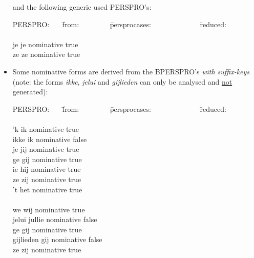 \begin{itemize}
and the following generic used PERSPRO's:

\begin{tabbing}
PERSPRO: \ \ \  \= from: \ \ \ \ \ \ \ \ \= persprocases: \ \ \ \ \ \ \  
\ \ \ \ \ \  \= reduced: \\
          \>               \>                    \>       \\
je        \> je            \>  nominative        \> true \\ 
ze        \> ze            \>  nominative        \> true \\ 
\end{tabbing}


  \item Some nominative forms are derived from the 
        BPERSPRO's {\em with suffix-keys} (note: the forms
        {\em ikke}, {\em jelui} and {\em gijlieden} can only be 
        analysed and \underline{not} generated):

\begin{tabbing}
PERSPRO: \ \ \  \= from: \ \ \ \ \ \ \ \ \= persprocases: \ \ \ \ \ \ \  
\ \ \ \ \ \  \= reduced: \\
         \>                \>                    \>       \\
'k       \> ik             \> nominative         \> true  \\
ikke     \> ik             \> nominative         \> false \\
je       \> jij            \> nominative         \> true  \\
ge       \> gij            \> nominative         \> true  \\
ie       \> hij            \> nominative         \> true  \\
ze       \> zij            \> nominative         \> true  \\
't       \> het            \> nominative         \> true  \\
         \>                \>                    \>       \\
we       \> wij            \> nominative         \> true  \\
jelui    \> jullie         \> nominative         \> false \\
ge       \> gij            \> nominative         \> true  \\
gijlieden\> gij            \> nominative         \> false \\
ze       \> zij            \> nominative         \> true  \\
\end{tabbing}


\end{itemize}
